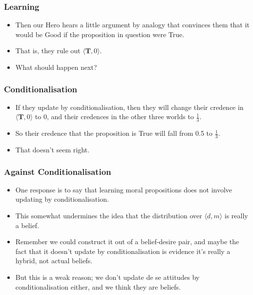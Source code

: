 \begin{frame}[fragile]
\frametitle{Learning}
\label{learning}

\begin{itemize}
\item{} Then our Hero hears a little argument by analogy that convinces them that it would be Good if the proposition in question were True.

\item{} That is, they rule out $\langle \textbf{T}, 0 \rangle$.

\item{} What should happen next?

\end{itemize}

\end{frame}

\begin{frame}[fragile]
\frametitle{Conditionalisation}
\label{conditionalisation}

\begin{itemize}
\item{} If they update by conditionalisation, then they will change their credence in $\langle \textbf{T}, 0 \rangle$ to 0, and their credences in the other three worlds to $\frac{1}{3}$.

\item{} So their credence that the proposition is True will fall from 0.5 to $\frac{1}{3}$.

\item{} That doesn't seem right.

\end{itemize}

\end{frame}

\begin{frame}[fragile]
\frametitle{Against Conditionalisation}
\label{againstconditionalisation}

\begin{itemize}
\item{} One response is to say that learning moral propositions does not involve updating by conditionalisation.

\item{} This somewhat undermines the idea that the distribution over $\langle d, m \rangle$ is really a belief.

\item{} Remember we could construct it out of a belief-desire pair, and maybe the fact that it doesn't update by conditionalisation is evidence it's really a hybrid, not actual beliefs.

\item{} But this is a weak reason; we don't update de se attitudes by conditionalisation either, and we think they are beliefs.

\end{itemize}

\end{frame}

